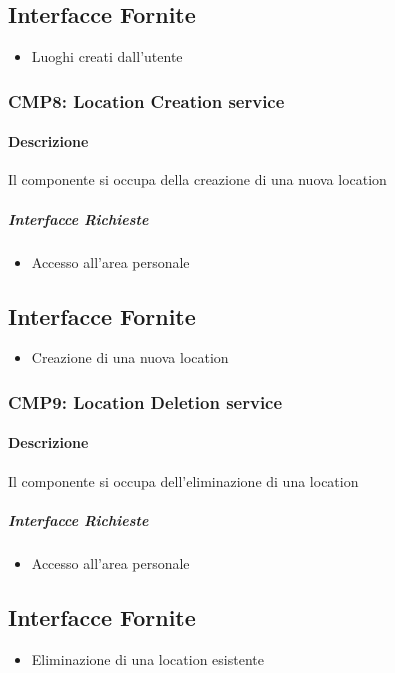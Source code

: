 \documentclass[9pt]{extarticle}
\begin{document}
\subsection{Interfacce Fornite}
\begin{itemize}
	\item Luoghi creati dall'utente
\end{itemize}

\subsubsection*{CMP8: Location Creation service}
\paragraph{Descrizione}
Il componente si occupa della creazione di una nuova location
\subparagraph{Interfacce Richieste}
\begin{itemize}
	\item Accesso all'area personale
\end{itemize}
\subsection{Interfacce Fornite}
\begin{itemize}
	\item Creazione di una nuova location
\end{itemize}

\subsubsection*{CMP9: Location Deletion service}
\paragraph{Descrizione}
Il componente si occupa dell'eliminazione di una location
\subparagraph{Interfacce Richieste}
\begin{itemize}
	\item Accesso all'area personale
\end{itemize}
\subsection{Interfacce Fornite}
\begin{itemize}
	\item Eliminazione di una location esistente
\end{itemize}
\end{document}
